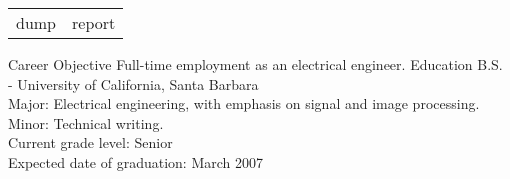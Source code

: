 \documentclass[letterpaper, 10pt]{article}
\begin{document}
\par
\par \bigskip\bigskip\bigskip\bigskip
\par
\par
\par
\par







\par\bigskip
\begin{tabular}{l | r} %
dump & report\\

\end{tabular}


\par{}

\begingroup
\raggedleft \noindent {}
\raggedright \noindent {}
\endgroup

\nrcsinglesection
{Career Objective}
{Full-time employment as an electrical engineer.}
\nrcsinglesection
{Education}
{B.S. - University of California, Santa Barbara \\
Major: Electrical engineering, with emphasis on signal and image processing.\\
Minor: Technical writing. \\
Current grade level: Senior \\
Expected date of graduation: March 2007 \\}
\end{document}
